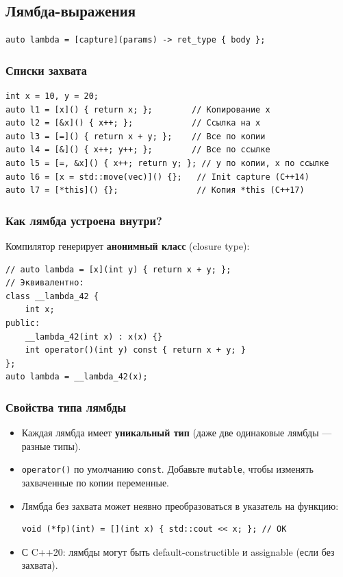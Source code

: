 \documentclass[12pt,a4paper]{article}
\begin{document}
\subsection{Лямбда-выражения}

\begin{lstlisting}
auto lambda = [capture](params) -> ret_type { body };
\end{lstlisting}

\subsubsection{Списки захвата}

\begin{lstlisting}
int x = 10, y = 20;
auto l1 = [x]() { return x; };        // Копирование x
auto l2 = [&x]() { x++; };            // Ссылка на x
auto l3 = [=]() { return x + y; };    // Все по копии
auto l4 = [&]() { x++; y++; };        // Все по ссылке
auto l5 = [=, &x]() { x++; return y; }; // y по копии, x по ссылке
auto l6 = [x = std::move(vec)]() {};   // Init capture (C++14)
auto l7 = [*this]() {};                // Копия *this (C++17)
\end{lstlisting}

\subsubsection{Как лямбда устроена внутри?}

Компилятор генерирует \textbf{анонимный класс} (closure type):
\begin{lstlisting}
// auto lambda = [x](int y) { return x + y; };
// Эквивалентно:
class __lambda_42 {
    int x;
public:
    __lambda_42(int x) : x(x) {}
    int operator()(int y) const { return x + y; }
};
auto lambda = __lambda_42(x);
\end{lstlisting}

\subsubsection{Свойства типа лямбды}

\begin{itemize}
    \item Каждая лямбда имеет \textbf{уникальный тип} (даже две одинаковые лямбды --- разные типы).
    \item \texttt{operator()} по умолчанию \texttt{const}. Добавьте \texttt{mutable}, чтобы изменять захваченные по копии переменные.
    \item Лямбда без захвата может неявно преобразоваться в указатель на функцию:
\begin{lstlisting}
void (*fp)(int) = [](int x) { std::cout << x; }; // OK
\end{lstlisting}
    \item С C++20: лямбды могут быть default-constructible и assignable (если без захвата).
\end{itemize}
\end{document}
